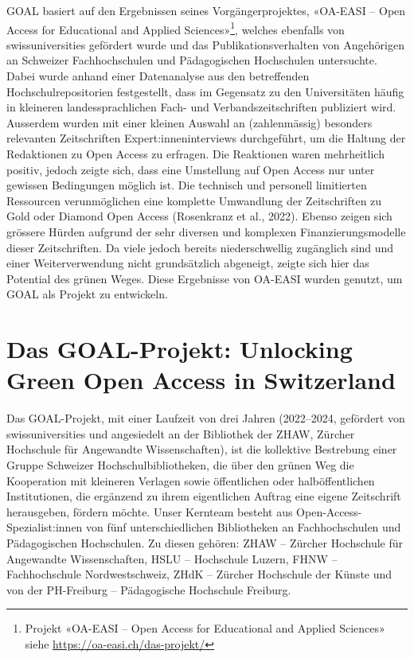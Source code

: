 \documentclass[a4paper,
fontsize=11pt,
oneside,
numbers=noperiodatend,
parskip=half-,
bibliography=totoc,
final
]{scrartcl}
\begin{document}
GOAL basiert auf den Ergebnissen seines Vorgängerprojektes, «OA-EASI --
Open Access for Educational and Applied Sciences»\footnote{Projekt
  «OA-EASI -- Open Access for Educational and Applied Sciences» siehe
  \url{https://oa-easi.ch/das-projekt/}}, welches ebenfalls von
swissuniversities gefördert wurde und das Publikationsverhalten von
Angehörigen an Schweizer Fachhochschulen und Pädagogischen Hochschulen
untersuchte. Dabei wurde anhand einer Datenanalyse aus den betreffenden
Hochschulrepositorien festgestellt, dass im Gegensatz zu den
Universitäten häufig in kleineren landessprachlichen Fach- und
Verbandszeitschriften publiziert wird. Ausserdem wurden mit einer
kleinen Auswahl an (zahlenmässig) besonders relevanten Zeitschriften
Expert:inneninterviews durchgeführt, um die Haltung der Redaktionen zu
Open Access zu erfragen. Die Reaktionen waren mehrheitlich positiv,
jedoch zeigte sich, dass eine Umstellung auf Open Access nur unter
gewissen Bedingungen möglich ist. Die technisch und personell
limitierten Ressourcen verunmöglichen eine komplette Umwandlung der
Zeitschriften zu Gold oder Diamond Open Access (Rosenkranz et al.,
2022). Ebenso zeigen sich grössere Hürden aufgrund der sehr diversen und
komplexen Finanzierungsmodelle dieser Zeitschriften. Da viele jedoch
bereits niederschwellig zugänglich sind und einer Weiterverwendung nicht
grundsätzlich abgeneigt, zeigte sich hier das Potential des grünen
Weges. Diese Ergebnisse von OA-EASI wurden genutzt, um GOAL als Projekt
zu entwickeln.

\hypertarget{das-goal-projekt-unlocking-green-open-access-in-switzerland}{%
\section{Das GOAL-Projekt: Unlocking Green Open Access in
Switzerland}\label{das-goal-projekt-unlocking-green-open-access-in-switzerland}}

Das GOAL-Projekt, mit einer Laufzeit von drei Jahren (2022--2024,
gefördert von swissuniversities und angesiedelt an der Bibliothek der
ZHAW, Zürcher Hochschule für Angewandte Wissenschaften), ist die
kollektive Bestrebung einer Gruppe Schweizer Hochschulbibliotheken, die
über den grünen Weg die Kooperation mit kleineren Verlagen sowie
öffentlichen oder halböffentlichen Institutionen, die ergänzend zu ihrem
eigentlichen Auftrag eine eigene Zeitschrift herausgeben, fördern
möchte. Unser Kernteam besteht aus Open-Access-Spezialist:innen von fünf
unterschiedlichen Bibliotheken an Fachhochschulen und Pädagogischen
Hochschulen. Zu diesen gehören: ZHAW -- Zürcher Hochschule für
Angewandte Wissenschaften, HSLU -- Hochschule Luzern, FHNW --
Fachhochschule Nordwestschweiz, ZHdK -- Zürcher Hochschule der Künste
und von der PH-Freiburg -- Pädagogische Hochschule Freiburg.
\end{document}
